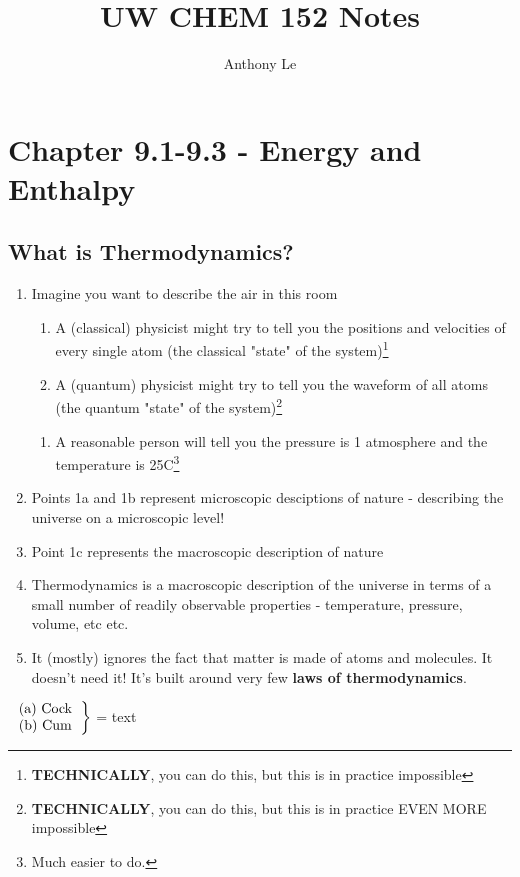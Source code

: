 \documentclass[../CHEM152Notes.tex]{subfiles}
\title{UW CHEM 152 Notes}
\author{Anthony Le}
\begin{document}
\pagestyle{fancy}
\fancyhead{}

\section*{Chapter 9.1-9.3 - Energy and Enthalpy}

\subsection*{What is Thermodynamics?}
\begin{enumerate}
    \item Imagine you want to describe the air in this room
    \begin{enumerate}
        \item A (classical) physicist might try to tell you the positions and velocities of every single atom (the classical "state" of the system)\footnote{\textbf{TECHNICALLY}, you can do this, but this is in practice impossible}
        \item A (quantum) physicist might try to tell you the waveform of all atoms (the quantum "state" of the system)\footnote{\textbf{TECHNICALLY}, you can do this, but this is in practice EVEN MORE impossible}
    \end{enumerate}
    \begin{enumerate}
        \item A reasonable person will tell you the pressure is 1 atmosphere and the temperature is 25C\footnote{Much easier to do.}
    \end{enumerate}
    \item Points 1a and 1b represent microscopic desciptions of nature - describing the universe on a microscopic level!
    \item Point 1c represents the macroscopic description of nature
    \item Thermodynamics is a macroscopic description of the universe in terms of a small number of readily observable properties - temperature, pressure, volume, etc etc.
    \item It (mostly) ignores the fact that matter is made of atoms and molecules. It doesn't need it! It's built around very few \textbf{laws of thermodynamics}. 
\end{enumerate}
$\left.
    \begin{tabular}{ll}
        (a) Cock \\
        (b) Cum
    \end{tabular}
\right\}$  = text
    
\end{document}

